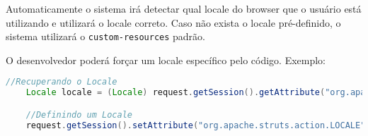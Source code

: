 Automaticamente o sistema irá detectar qual locale do browser que o usuário está
utilizando e utilizará o locale correto. Caso não exista o locale pré-definido,
o sistema utilizará o \texttt{custom-resources} padrão.

O desenvolvedor poderá forçar um locale específico pelo código. Exemplo: 

\begin{lstlisting}[language=java, frame=single, breaklines=true]
	//Recuperando o Locale
	Locale locale = (Locale) request.getSession().getAttribute("org.apache.struts.action.LOCALE");

	//Definindo um Locale
	request.getSession().setAttribute("org.apache.struts.action.LOCALE", new Locale("pt", "BR"));
\end{lstlisting}
